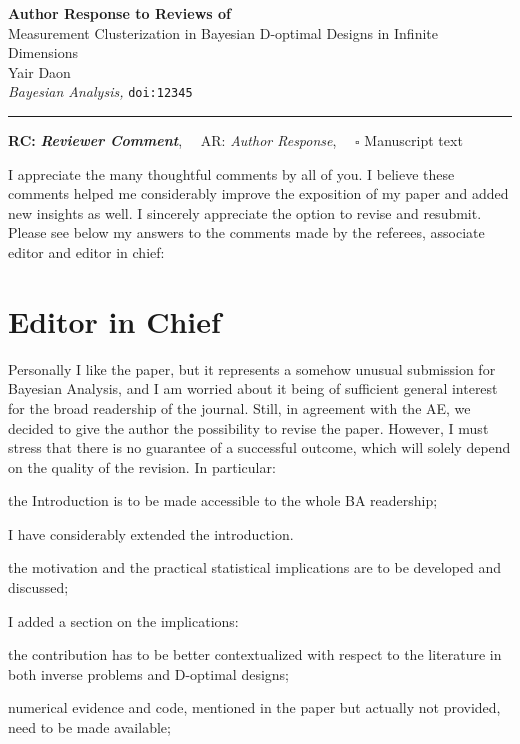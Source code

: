 \documentclass{article}
\def\papertitle{Measurement Clusterization in Bayesian D-optimal Designs in Infinite Dimensions}
\def\authors{Yair Daon}
\def\journal{Bayesian Analysis}
\def\doi{12345}
\providecommand{\lettertitle}{Author Response to Reviews of}
\providecommand{\papertitle}{Title}
\providecommand{\authors}{Authors}
\providecommand{\journal}{Journal}
\providecommand{\doi}{--}
\begin{document}
{\Large\bf \lettertitle}\\[1em]
{\huge \papertitle}\\[1em]
{\authors}\\
{\it \journal, }\texttt{doi:\doi}\\
\hrule

\hfill {\bfseries RC:} \textbf{\textit{Reviewer Comment}},\(\quad\) AR: \emph{Author Response}, \(\quad\square\) Manuscript text

I appreciate the many thoughtful comments by all of you. I believe
these comments helped me considerably improve the exposition of my
paper and added new insights as well. I sincerely appreciate the
option to revise and resubmit. Please see below my answers to the
comments made by the referees, associate editor and editor in chief:
 



\section{Editor in Chief}
\RC Personally I like the paper, but it represents a somehow unusual
submission for Bayesian Analysis, and I am worried about it being of
sufficient general interest for the broad readership of the
journal. Still, in agreement with the AE, we decided to give the
author the possibility to revise the paper. However, I must stress
that there is no guarantee of a successful outcome, which will solely
depend on the quality of the revision. In particular:

\RC the Introduction is to be made accessible to the whole BA
    readership;
    
\AR  I have considerably extended the introduction.
   
    
\RV the motivation and the practical statistical implications are to
be developed and discussed;

\AR I added a section on the implications:
\begin{quote}
  
\end{quote}
   
    
\RC the contribution has to be better contextualized with respect to
the literature in both inverse problems and D-optimal designs;

    
\RC numerical evidence and code, mentioned in the paper but actually
not provided, need to be made available;
    
\end{document}
